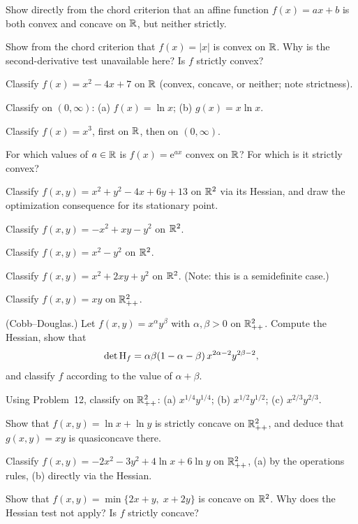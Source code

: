\begin{problems}
  \item Show directly from the chord criterion that an affine function
        $f(x)=ax+b$ is both convex and concave on $\mathbb{R}$, but neither
        strictly.
  \item Show from the chord criterion that $f(x)=|x|$ is convex on $\mathbb{R}$.
        Why is the second-derivative test unavailable here? Is $f$
        strictly convex?
  \item Classify $f(x)=x^{2}-4x+7$ on $\mathbb{R}$ (convex, concave, or neither;
        note strictness).
  \item Classify on $(0,\infty)$: (a) $f(x)=\ln x$; (b) $g(x)=x\ln x$.
  \item Classify $f(x)=x^{3}$, first on $\mathbb{R}$, then on $(0,\infty)$.
  \item For which values of $a\in\mathbb{R}$ is $f(x)=\mathrm{e}^{ax}$ convex on
        $\mathbb{R}$? For which is it strictly convex?
  \item Classify $f(x,y)=x^{2}+y^{2}-4x+6y+13$ on $\mathbb{R}^{2}$ via its
        Hessian, and draw the optimization consequence for its stationary
        point.
  \item Classify $f(x,y)=-x^{2}+xy-y^{2}$ on $\mathbb{R}^{2}$.
  \item Classify $f(x,y)=x^{2}-y^{2}$ on $\mathbb{R}^{2}$.
  \item Classify $f(x,y)=x^{2}+2xy+y^{2}$ on $\mathbb{R}^{2}$. (Note: this is a
        semidefinite case.)
  \item Classify $f(x,y)=xy$ on $\mathbb{R}^{2}_{++}$.
  \item (Cobb--Douglas.) Let $f(x,y)=x^{\alpha}y^{\beta}$ with
        $\alpha,\beta>0$ on $\mathbb{R}^{2}_{++}$. Compute the Hessian, show that
        \[
          \det\operatorname{H}_f=\alpha\beta(1-\alpha-\beta)\,x^{2\alpha-2}y^{2\beta-2},
        \]
        and classify $f$ according to the value of $\alpha+\beta$.
  \item Using Problem~12, classify on $\mathbb{R}^{2}_{++}$:
        (a) $x^{1/4}y^{1/4}$; \; (b) $x^{1/2}y^{1/2}$; \;
        (c) $x^{2/3}y^{2/3}$.
  \item Show that $f(x,y)=\ln x+\ln y$ is strictly concave on
        $\mathbb{R}^{2}_{++}$, and deduce that $g(x,y)=xy$ is quasiconcave there.
  \item Classify $f(x,y)=-2x^{2}-3y^{2}+4\ln x+6\ln y$ on $\mathbb{R}^{2}_{++}$,
        (a) by the operations rules, (b) directly via the Hessian.
  \item Show that $f(x,y)=\min\{2x+y,\;x+2y\}$ is concave on $\mathbb{R}^{2}$.
        Why does the Hessian test not apply? Is $f$ strictly concave?

\end{problems}

